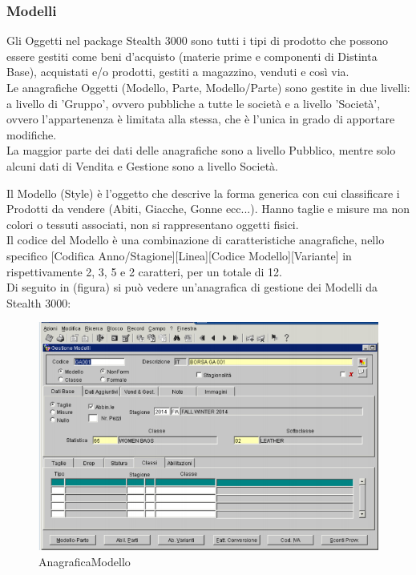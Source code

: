 \subsubsection{Modelli}
Gli Oggetti nel package Stealth 3000 sono tutti i tipi di prodotto che possono essere gestiti come beni d’acquisto (materie prime e componenti di Distinta Base), acquistati e/o prodotti, gestiti a magazzino, venduti e così via. \\
Le anagrafiche Oggetti (Modello, Parte, Modello/Parte) sono gestite in due livelli: a livello di 'Gruppo', ovvero pubbliche a tutte le società e a livello 'Società', ovvero l'appartenenza è limitata alla stessa, che è l'unica in grado di apportare modifiche.\\
 La maggior parte dei dati delle anagrafiche sono a livello Pubblico, mentre solo alcuni dati di Vendita e Gestione sono a livello Società.

Il Modello (Style) è l’oggetto che descrive la forma generica con cui classificare i Prodotti da vendere (Abiti, Giacche, Gonne ecc...). Hanno taglie e misure ma non colori o tessuti associati, non si rappresentano oggetti fisici.\\ 
Il codice del Modello è una combinazione di caratteristiche anagrafiche, nello specifico [Codifica Anno/Stagione][Linea][Codice Modello][Variante] in rispettivamente 2, 3, 5 e 2 caratteri, per un totale di 12.\\
Di seguito in (figura) si può vedere un'anagrafica di gestione dei Modelli da Stealth 3000:
\begin{figure}[!h]
\thispagestyle{empty}
\centering
\includegraphics[scale=0.90]{img/Modello.png}
\caption{AnagraficaModello}
\end{figure}
\newpage

